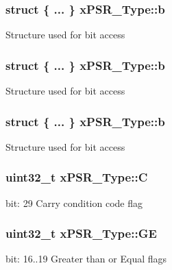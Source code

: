 \subsubsection[{\texorpdfstring{b}{b}}]{\setlength{\rightskip}{0pt plus 5cm}struct \{ ... \}   x\+P\+S\+R\+\_\+\+Type\+::b}\hypertarget{unionxPSR__Type_adfd25f02d5b867f9075e25f06f2f4d7d}{}\label{unionxPSR__Type_adfd25f02d5b867f9075e25f06f2f4d7d}
Structure used for bit access 
\subsubsection[{\texorpdfstring{b}{b}}]{\setlength{\rightskip}{0pt plus 5cm}struct \{ ... \}   x\+P\+S\+R\+\_\+\+Type\+::b}\hypertarget{unionxPSR__Type_a45ed8981cba3995bc0bd339cb99ba018}{}\label{unionxPSR__Type_a45ed8981cba3995bc0bd339cb99ba018}
Structure used for bit access 
\subsubsection[{\texorpdfstring{b}{b}}]{\setlength{\rightskip}{0pt plus 5cm}struct \{ ... \}   x\+P\+S\+R\+\_\+\+Type\+::b}\hypertarget{unionxPSR__Type_aee583758e7914c82d82b2ff033eb3812}{}\label{unionxPSR__Type_aee583758e7914c82d82b2ff033eb3812}
Structure used for bit access 
\subsubsection[{\texorpdfstring{C}{C}}]{\setlength{\rightskip}{0pt plus 5cm}uint32\+\_\+t x\+P\+S\+R\+\_\+\+Type\+::C}\hypertarget{unionxPSR__Type_a40213a6b5620410cac83b0d89564609d}{}\label{unionxPSR__Type_a40213a6b5620410cac83b0d89564609d}
bit\+: 29 Carry condition code flag 
\subsubsection[{\texorpdfstring{GE}{GE}}]{\setlength{\rightskip}{0pt plus 5cm}uint32\+\_\+t x\+P\+S\+R\+\_\+\+Type\+::\+GE}\hypertarget{unionxPSR__Type_a2d0ec4ccae337c1df5658f8cf4632e76}{}\label{unionxPSR__Type_a2d0ec4ccae337c1df5658f8cf4632e76}
bit\+: 16..19 Greater than or Equal flags 
